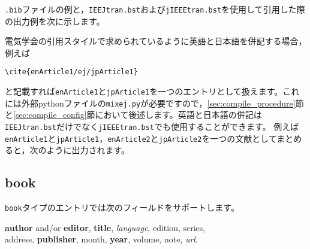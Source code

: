 \documentclass[10pt, a4paper, dvipdfmx, uplatex]{jsarticle} %
\renewcommand{\refname}{\small 参考文献}
\newcommand{\putlst}[1]{
  \noindent\makebox[\linewidth]{\rule{\linewidth}{0.4pt}}\vspace{-1.5zw}
  \vspace{-1.8zw}
  \noindent\makebox[\linewidth]{\rule{\linewidth}{0.4pt}}\vspace{0.5zw}\par
}
\begin{document}
\texttt{.bib}ファイルの例と，\texttt{IEEJtran.bst}および\texttt{jIEEEtran.bst}を使用して引用した際の出力例を次に示します。

\putlst{article.bib}

\begin{bibunit}[IEEJtran]
  \nocite{Article,jpArticle1,jpArticle2,jpArticle3,enArticle1,enArticle2,enArticle3,enArticle4}
  \renewcommand{\refname}{\small 参考文献(IEEJtran.bst)}
  {\small \putbib[./article]}
\end{bibunit}
\begin{bibunit}[jIEEEtran]
  \nocite{Article,jpArticle1,jpArticle2,jpArticle3,enArticle1,enArticle2,enArticle3,enArticle4}
  \renewcommand{\refname}{\small 参考文献(jIEEEtran.bst)}
  {\small \putbib[./article]}
\end{bibunit}

\vspace{2em}
電気学会の引用スタイルで求められているように英語と日本語を併記する場合，例えば
\begin{center}
  \verb*|\cite{enArticle1/ej/jpArticle1}|
\end{center}
と記載すれば\texttt{enArticle1}と\texttt{jpArticle1}を一つのエントリとして扱えます。これには外部pythonファイルの\texttt{mixej.py}が必要ですので，\ref{sec:compile_procedure}節と\ref{sec:compile_config}節において後述します。英語と日本語の併記は\texttt{IEEJtran.bst}だけでなく\texttt{jIEEEtran.bst}でも使用することができます。
例えば\texttt{enArticle1}と\texttt{jpArticle1}，\texttt{enArticle2}と\texttt{jpArticle2}を一つの文献としてまとめると，次のように出力されます。

\begin{bibunit}[IEEJtran]
  \nocite{enArticle1/ej/jpArticle1,enArticle2/ej/jpArticle2}
  \renewcommand{\refname}{\small 英日を併記した参考文献(IEEJtran.bst)}
  {\small \putbib[./article]}
\end{bibunit}
\begin{bibunit}[jIEEEtran]
  \nocite{enArticle1/ej/jpArticle1,enArticle2/ej/jpArticle2}
  \renewcommand{\refname}{\small 英日を併記した参考文献(jIEEEtran.bst)}
  {\small \putbib[./article]}
\end{bibunit}


\subsection{book}

\texttt{book}タイプのエントリでは次のフィールドをサポートします。

\begin{center}
  \textbf{author} and/or \textbf{editor}, \textbf{title}, \textsl{language}, edition,
  series, \\
  address, \textbf{publisher}, month, \textbf{year}, volume, note, \textsl{url}.
\end{center}
\end{document}
